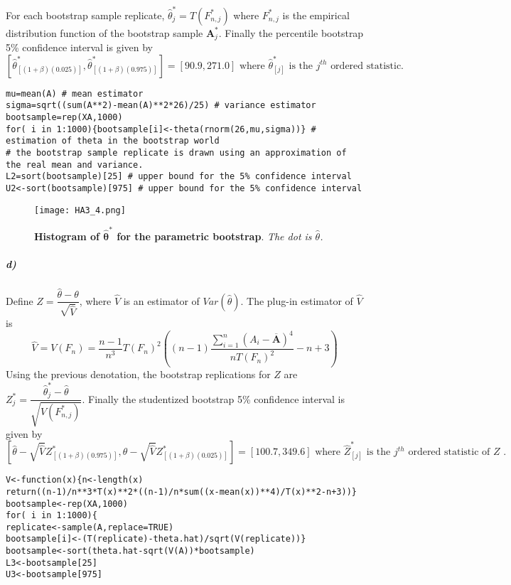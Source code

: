 \documentclass{article}
\begin{document}
For each bootstrap sample replicate, $\widehat{\theta}_j^*=T(F_{n,j}^*)$ where $F_{n,j}^*$ is the empirical distribution function of the bootstrap sample $\pmb{A}_j^*$. Finally the percentile bootstrap 5\% confidence interval is given by $$\left[\widehat{\theta}^*_{[(1+\beta)(0.025)]} , \widehat{\theta}^*_{[(1+\beta)(0.975)]} \right]=[90.9,271.0]\text{ where $\widehat{\theta}^*_{[j]}$ is the $j^{th}$ ordered statistic.} $$
 
\begin{footnotesize}
\begin{verbatim}
mu=mean(A) # mean estimator
sigma=sqrt((sum(A**2)-mean(A)**2*26)/25) # variance estimator
bootsample=rep(XA,1000)
for( i in 1:1000){bootsample[i]<-theta(rnorm(26,mu,sigma))} # estimation of theta in the bootstrap world
# the bootstrap sample replicate is drawn using an approximation of the real mean and variance.
L2=sort(bootsample)[25] # upper bound for the 5% confidence interval
U2<-sort(bootsample)[975] # upper bound for the 5% confidence interval
\end{verbatim}
\end{footnotesize}
\begin{figure}[H]
	  \centering
  	\texttt{[image: HA3\_4.png]}
  	\caption{\textbf{Histogram of $\pmb{\widehat{\theta}^*}$ for the parametric bootstrap}. \textsl{The dot is $\widehat{\theta}$.}}
	\end{figure}
\subparagraph{d)}

Define $Z=\dfrac{\widehat{\theta}-\theta}{\sqrt{\widehat{V}}}$, where $\widehat{V}$ is an estimator of $Var(\widehat{\theta})$. The plug-in 
estimator of $\widehat{V}$ is $$\widehat{V}=V(F_n)=\dfrac{n-1}{n^3} T(F_n)^2 \left((n-1) \dfrac{\sum_{i=1}^n(A_i-\overline{\pmb{A}})^4}{nT(F_n)^2}-n+3 \right) $$
Using the previous denotation, the bootstrap replications for $Z$ are $Z^*_j=\dfrac{\widehat{\theta}^*_j-\widehat{\theta}}{\sqrt{V(F^*_{n,j})}}$. 
Finally the studentized bootstrap 5\% confidence interval is given by 
$$\left[ \widehat{\theta}-\sqrt{\widehat{V}}Z^*_{[(1+\beta)(0.975)]} , \widehat{\theta}-\sqrt{\widehat{V}}Z^*_{[(1+\beta)(0.025)]} \right]=[100.7,349.6] \text{ where $\widehat{Z}^*_{[j]}$ is the $j^{th}$ ordered statistic of $Z$ .}$$
\begin{footnotesize}
\begin{verbatim}
V<-function(x){n<-length(x)
return((n-1)/n**3*T(x)**2*((n-1)/n*sum((x-mean(x))**4)/T(x)**2-n+3))}
bootsample<-rep(XA,1000)
for( i in 1:1000){
replicate<-sample(A,replace=TRUE)
bootsample[i]<-(T(replicate)-theta.hat)/sqrt(V(replicate))}
bootsample<-sort(theta.hat-sqrt(V(A))*bootsample)
L3<-bootsample[25]
U3<-bootsample[975]
\end{verbatim}
\end{footnotesize}
\end{document}
